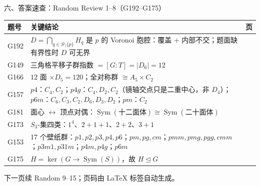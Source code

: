 \documentclass[aspectratio=169,10pt,fontset=none]{ctexbeamer}
\begin{document}
\begin{frame}[t]{六、答案速查：Random Review 1--8（G192--G175）}
  \label{sec:answers}
  \centering
  \scriptsize
  \setlength{\tabcolsep}{3pt}
  \renewcommand{\arraystretch}{1.16}
  \begin{tabular}{@{}l p{10.0cm} c@{}}
    \toprule
    题号 & 关键结论 & 页\\
    \midrule
    G192 & $D=\bigcap_{q\in S\setminus\{p\}}H_q$ 是 $p$ 的 Voronoi 胞腔：覆盖 + 内部不交；题面缺有界性时 $D$ 可无界 & \pageref{ex:G192}\\
    G149 & 三角格平移子群指数 $=[G:T]=|D_6|=12$ & \pageref{ex:G149}\\
    G166 & $12$ 面 $\times D_5=120$；全对称群 $\cong A_5\times C_2$ & \pageref{ex:G166}\\
    G157 & $p4$：$C_4,C_2$；$p4g$：$C_4,D_2,C_2$（镜轴交点只是二重中心，非 $D_4$）；$p6m$：$C_6,C_3,C_2,D_6,D_3,D_2$；$pm$：$C_2$ & \pageref{ex:G157}\\
    G181 & 面心 $\leftrightarrow$ 顶点对偶：$\operatorname{Sym}(\text{十二面体})\cong\operatorname{Sym}(\text{二十面体})$ & \pageref{ex:G181}\\
    G173 & $S_3$-集四类：$1^4$、$2+1+1$、$2+2$、$3+1$ & \pageref{ex:G173}\\
    G153 & 17 个壁纸群：$p1,p2,p3,p4,p6$；$pm,pg,cm$；$pmm,pmg,pgg,cmm$；$p3m1,p31m$；$p4m,p4g$；$p6m$ & \pageref{ex:G153}\\
    G175 & $H=\ker(G\to\operatorname{Sym}(S))$，故 $H\trianglelefteq G$ & \pageref{ex:G175}\\
    \bottomrule
  \end{tabular}
  \vspace{0.3em}
  {\scriptsize\color{ink!70} 下一页续 Random 9--15；页码由 \LaTeX{} 标签自动生成。}
\end{frame}
\end{document}

